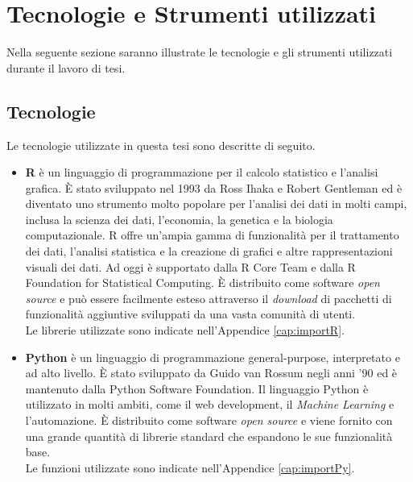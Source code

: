 \section{Tecnologie e Strumenti utilizzati}
Nella seguente sezione saranno illustrate le tecnologie e gli strumenti utilizzati durante il lavoro di tesi. 
\subsection{Tecnologie}
Le tecnologie utilizzate in questa tesi sono descritte di seguito.
\begin{itemize}
	\item \textbf{R} \autocite{R-language} è un linguaggio di programmazione per il calcolo statistico e l'analisi grafica. È stato sviluppato nel 1993 da Ross Ihaka e Robert Gentleman ed è diventato uno strumento molto popolare per l'analisi dei dati in molti campi, inclusa la scienza dei dati, l'economia, la genetica e la biologia computazionale. R offre un'ampia gamma di funzionalità per il trattamento dei dati, l'analisi statistica e la creazione di grafici e altre rappresentazioni visuali dei dati. Ad oggi è supportato dalla R Core Team e dalla R Foundation for Statistical Computing. È distribuito come software \emph{open source} e può essere facilmente esteso attraverso il \emph{download} di pacchetti di funzionalità aggiuntive sviluppati da una vasta comunità di utenti.\\
	Le librerie utilizzate sono indicate nell'Appendice \ref{cap:importR}.
	\item \textbf{Python} \autocite{van2003introduction} è un linguaggio di programmazione general-purpose, interpretato e ad alto livello. È stato sviluppato da Guido van Rossum negli anni '90 ed è mantenuto dalla Python Software Foundation. Il linguaggio Python è utilizzato in molti ambiti, come il web development, il \emph{Machine Learning} e l'automazione. È distribuito come software \emph{open source} e viene fornito con una grande quantità di librerie standard che espandono le sue funzionalità base.\\
	Le funzioni utilizzate sono indicate nell'Appendice \ref{cap:importPy}.
\end{itemize}


\begin{comment}
library(ggmosaic)
library(ggplot2)
library(gridExtra)
@article{marchiori2020secrets,
	title={Secrets of soccer: Neural network flows and game performance},
	author={Marchiori, Massimo and de Vecchi, Marco},
	journal={Computers \& Electrical Engineering},
	volume={81},
	pages={106505},
	year={2020},
	publisher={Elsevier}
}
\end{comment}

